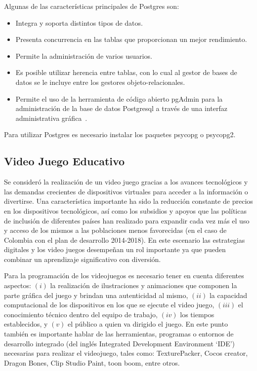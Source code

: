 \documentclass[journal,transmag]{IEEEtran}
\begin{document}
Algunas de las características principales de Postgres son:

\begin{itemize}
\item Integra y soporta distintos tipos de datos.
\item Presenta concurrencia en las tablas que proporcionan un mejor rendimiento.
\item Permite la administración de varios usuarios.
\item Es posible utilizar herencia entre tablas, con lo cual al gestor de bases de datos se le incluye entre los gestores objeto-relacionales.
\item Permite el uso de la herramienta de código abierto pgAdmin para la administración de la base de datos Postgresql a través de una interfaz administrativa gráfica~\cite{Pgadmin}.
\end{itemize}

Para utilizar Postgres es necesario instalar los paquetes psycopg o psycopg2.

\subsection{Video Juego Educativo}\label{videojuego}
Se consideró la realización de un video juego gracias a los avances tecnológicos y las demandas crecientes de dispositivos virtuales para acceder a la información o divertirse. Una característica importante ha sido la reducción constante de precios en los dispositivos tecnológicos, así como los subsidios y apoyos que las políticas de inclusión de diferentes países han realizado para expandir cada vez más el uso y acceso de los mismos a las poblaciones menos favorecidas (en el caso de Colombia con el plan de desarrollo 2014-2018). En este escenario las estrategias digitales y los video juegos desempeñan un rol importante ya que pueden combinar un aprendizaje significativo con diversión.

Para la programación de los videojuegos es necesario tener en cuenta diferentes aspectos: $(i)$ la realización de ilustraciones y animaciones que componen la parte gráfica del juego y brindan una autenticidad al mismo, $(ii)$ la capacidad computacional de los dispositivos en los que se ejecute el video juego, $(iii)$ el conocimiento técnico dentro del equipo de trabajo, $(iv)$ los tiempos establecidos, y $(v)$ el público a quien va dirigido el juego. En este punto también es importante hablar de las herramientas, programas o entornos de desarrollo integrado (del inglés Integrated Development Environment `IDE') necesarias para realizar el videojuego, tales como: TexturePacker, Cocos creator, Dragon Bones, Clip Studio Paint, toon boom, entre otros.
\end{document}
